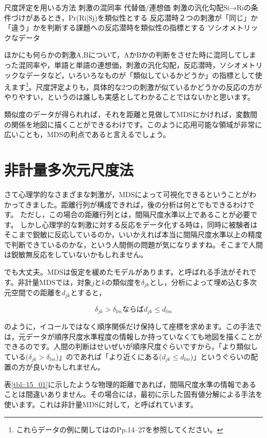 \documentclass{ltjsbook}
\begin{document}
尺度評定を用いる方法
刺激の混同率
代替価/連想価
刺激の汎化勾配Si→Riの条件づけがあるとき，Pr(Ri|Sj)を類似性とする
反応潜時２つの刺激が「同じ」か「違う」かを判断する課題への反応潜時を類似性の指標とする
ソシオメトリックなデータ



ほかにも何らかの刺激A,Bについて，AかBかの判断をさせた時に混同してしまった混同率や，単語と単語の連想価，刺激の汎化勾配，反応潜時，ソシオメトリックなデータなど，いろいろなものが「類似しているかどうか」の指標として使えます\footnote{これらデータの例に関しては\citet{Takane198002}のPp.14--27を参照してください。}。尺度評定よりも，具体的な2つの刺激が似ているかどうかの反応の方がやりやすい，というのは誰しも実感としてわかることではないかと思います。

類似度のデータが得られれば，それを距離と見做してMDSにかければ，変数間の関係を地図に描くことができるわけです。このように応用可能な領域が非常に広いことも，MDSの利点であると言えるでしょう。

\section{非計量多次元尺度法}

さて心理学的なさまざまな刺激が，MDSによって可視化できるということがわかってきました。距離行列が構成できれば，後の分析は何とでもできるわけです。
ただし，この場合の距離行列とは，間隔尺度水準以上であることが必要です。
しかし心理学的な刺激に対する反応をデータ化する時は，同時に被験者はそこまで鋭敏に反応しているのか，いいかえれば本当に間隔尺度水準以上の精度で判断できているのかな，という人間側の問題が気になりますね。そこまで人間は鋭敏無反応をしていないかもしれません。

でも大丈夫。MDSは仮定を緩めたモデルがあります。と呼ばれる手法がそれです。非計量MDSでは，対象$j$と$k$の類似度を$\delta_{jk}$とし，分析によって埋め込む多次元空間での距離を$d_{jk}$とすると，

$$ \delta_{jk} > \delta_{lm} \mbox{ならば}d_{jk}\le d_{lm} $$

のように，イコールではなく順序関係だけ保持して座標を求めます。この手法では，元データが順序尺度水準程度の情報しか持っていなくても地図を描くことができるのです。人間の判断はせいぜいが順序尺度ぐらいですから，「より類似している($\delta_{jk} > \delta_{lm}$)」のであれば「より近くにある($d_{jk}\le d_{lm} $)」というぐらいの配置の方が良いかもしれません。


表\ref{tbl::15_01}に示したような物理的距離であれば，間隔尺度水準の情報であることは間違いありません。その場合には，最初に示した固有値分解による手法を使います。これは非計量MDSに対して，と呼ばれています。
\end{document}
